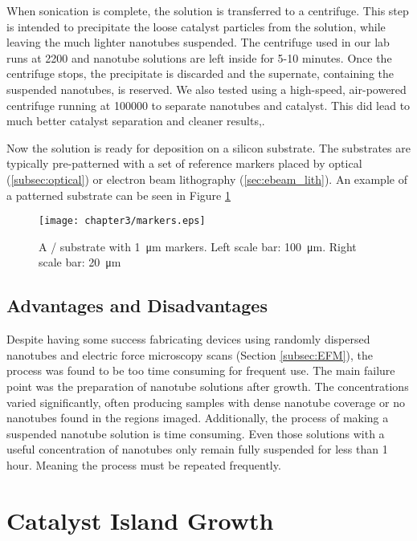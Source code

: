 When sonication is complete, the solution is transferred to a centrifuge. This step is intended to precipitate the loose catalyst particles from the solution, while leaving the much lighter nanotubes suspended. The centrifuge used in our lab runs at \SI{2200}{\rpm} and nanotube solutions are left inside for 5-10 minutes. Once the centrifuge stops, the precipitate is discarded and the supernate, containing the suspended nanotubes, is reserved. We also tested using a high-speed, air-powered centrifuge running at \SI{100000}{\rpm} to separate nanotubes and catalyst. This did lead to much better catalyst separation and cleaner results,.

Now the solution is ready for deposition on a silicon substrate. The substrates are typically pre-patterned with a set of reference markers placed by optical (\ref{subsec:optical}) or electron beam lithography (\ref{sec:ebeam_lith}). An example of a patterned substrate can be seen in Figure \ref{fig:markers}

\begin{figure}
    \centering
    \texttt{[image: chapter3/markers.eps]}
    \caption{A / substrate with \SI{1}{\micro\meter}  markers. Left scale bar: \SI{100}{\micro\meter}. Right scale bar: \SI{20}{\micro\meter} }
    \label{fig:markers}
\end{figure}

\subsection{Advantages and Disadvantages}

Despite having some success fabricating devices using randomly dispersed nanotubes and electric force microscopy scans (Section \ref{subsec:EFM}), the process was found to be too time consuming for frequent use. The main failure point was the preparation of nanotube solutions after growth. The concentrations varied significantly, often producing samples with dense nanotube coverage or no nanotubes found in the regions imaged. Additionally, the process of making a suspended nanotube solution is time consuming. Even those solutions with a useful concentration of nanotubes only remain fully suspended for less than 1 hour. Meaning the process must be repeated frequently.

\section{Catalyst Island Growth}
\label{sec:catalyst_island}


